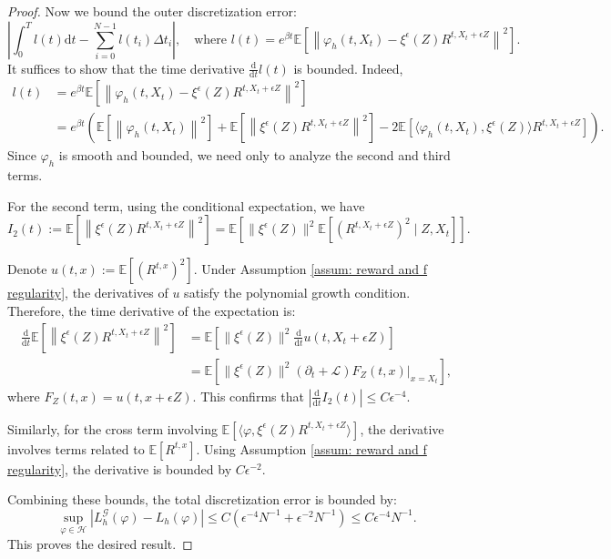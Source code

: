 \documentclass[10pt,a4paper]{amsart}
\newcommand{\E}{\mathbb{E}}
\newcommand{\cH}{\mathcal{H}}
\newcommand{\dd}{\mathrm{d}}
\begin{document}
\begin{proof}
Now we bound the outer discretization error:
\begin{equation}
    \left| \int_0^T l(t) \dd t - \sum_{i=0}^{N-1} l(t_i) \Delta t_i \right|, \quad \text{where } l(t) = e^{\beta t} \E \left[ \left\| \varphi_h(t, X_t) - \xi^\epsilon(Z)R^{t,X_t + \epsilon Z} \right\|^2 \right].
\end{equation}
It suffices to show that the time derivative $\frac{\dd}{\dd t} l(t)$ is bounded. Indeed,
\begin{equation}
\begin{aligned}
    l(t) &= e^{\beta t}\E \left[ \left\| \varphi_h(t, X_t) - \xi^\epsilon(Z)R^{t,X_t + \epsilon Z} \right\|^2 \right] \\
    &= e^{\beta t}\left(\E\left[ \left\|\varphi_h(t,X_t)\right\|^2\right] + \E \left[ \left\| \xi^{\epsilon}(Z) R^{t, X_t+\epsilon Z} \right\|^2 \right] - 2\E\left[ \langle \varphi_h(t,X_t), \xi^{\epsilon}(Z) \rangle R^{t,X_t + \epsilon Z}\right]\right).
    \end{aligned}
\end{equation}
Since $ \varphi_h$ is smooth and bounded, we need only to analyze the second and third terms.

For the second term, using the conditional expectation, we have
\begin{equation}
    I_2(t):=\E\left[ \left\| \xi^{\epsilon}(Z) R^{t, X_t+\epsilon Z} \right\|^2\right] = \E\left[ \|\xi^{\epsilon}(Z)\|^2 \E\left[ (R^{t,X_t + \epsilon Z})^2\mid Z,X_t\right]\right].
\end{equation}

Denote $u(t, x) := \E [ (R^{t,x})^2 ]$.
Under Assumption \ref{assum: reward and f regularity}, the  derivatives of $ u$ satisfy the polynomial growth condition.
Therefore, the time derivative of the expectation is:
\begin{equation}
\begin{aligned}
    \frac{\dd}{\dd t}\E\left[ \left\| \xi^{\epsilon}(Z) R^{t, X_t+\epsilon Z} \right\|^2\right]& =   \E[\|\xi^{\epsilon}(Z)\|^2 \frac{\dd}{\dd t}u(t, X_t + \epsilon Z)] \\
    &= \E \left[ \|\xi^{\epsilon}(Z)\|^2(\partial_t + \mathcal{L}) F_Z(t,x)\big|_{x = X_t} \right],
    \end{aligned}
\end{equation}
where $ F_Z(t,x) = u(t,x + \epsilon Z)$.
This confirms that $|\frac{\dd}{\dd t} I_2(t)| \le C \epsilon^{-4}$.

Similarly, for the cross term involving $\E [ \langle \varphi, \xi^\epsilon(Z)R^{t,X_t+\epsilon Z} \rangle ]$, the derivative involves terms related to $\E[R^{t,x}]$. Using Assumption \ref{assum: reward and f regularity}, the derivative is bounded by $C \epsilon^{-2}$.


Combining these bounds, the total discretization error is bounded by:
\begin{equation}
    \sup_{\varphi \in \cH} \left| L_h^{\mathcal{G}}(\varphi) - L_h(\varphi) \right| \le C \left( \epsilon^{-4} N^{-1} + \epsilon^{-2} N^{-1} \right) \le C \epsilon^{-4} N^{-1}.
\end{equation}
This proves the desired result.
\end{proof}
\end{document}
